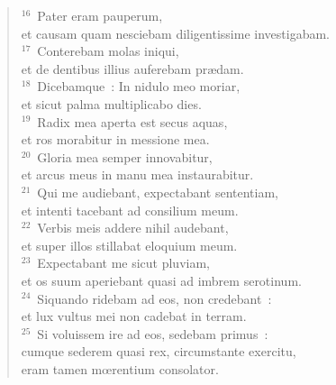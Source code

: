 \begin{flushleft}
\begin{verse}
${}^{16}$~Pater eram pauperum,\\ et causam quam nesciebam diligentissime investigabam.\\
${}^{17}$~Conterebam molas iniqui,\\ et de dentibus illius auferebam pr\ae dam.\\
${}^{18}$~Dicebamque~: In nidulo meo moriar,\\ et sicut palma multiplicabo dies.\\
${}^{19}$~Radix mea aperta est secus aquas,\\ et ros morabitur in messione mea.\\
${}^{20}$~Gloria mea semper innovabitur,\\ et arcus meus in manu mea instaurabitur.\\
${}^{21}$~Qui me audiebant, expectabant sententiam,\\ et intenti tacebant ad consilium meum.\\
${}^{22}$~Verbis meis addere nihil audebant,\\ et super illos stillabat eloquium meum.\\
${}^{23}$~Expectabant me sicut pluviam,\\ et os suum aperiebant quasi ad imbrem serotinum.\\
${}^{24}$~Siquando ridebam ad eos, non credebant~:\\ et lux vultus mei non cadebat in terram.\\
${}^{25}$~Si voluissem ire ad eos, sedebam primus~:\\ cumque sederem quasi rex, circumstante exercitu,\\ eram tamen mœrentium consolator.\end{verse}\end{flushleft}


